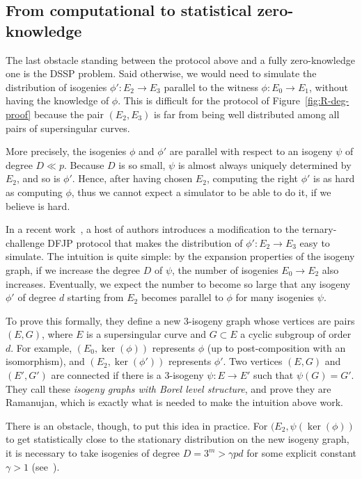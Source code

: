 \subsection{From computational to statistical zero-knowledge}

The last obstacle standing between the protocol above and a fully
zero-knowledge one is the DSSP problem. Said otherwise, we would need
to simulate the distribution of isogenies $\phi': E_2\to E_3$ parallel
to the witness $\phi: E_0\to E_1$, without having the knowledge of
$\phi$.  This is difficult for the protocol of
Figure~\ref{fig:R-deg-proof} because the pair $(E_2,E_3)$ is far from
being well distributed among all pairs of supersingular curves.

More precisely, the isogenies $\phi$ and $\phi'$ are parallel with
respect to an isogeny $\psi$ of degree $D \ll p$.  Because $D$ is so
small, $\psi$ is almost always uniquely determined by $E_2$, and so is
$\phi'$.  Hence, after having chosen $E_2$, computing the right
$\phi'$ is as hard as computing $\phi$, thus we cannot expect a
simulator to be able to do it, if we believe \R[deg] is hard.

In a recent work~\cite{cryptoeprint:2022/1469}, a host of
authors introduces a modification to the ternary-challenge DFJP
protocol that makes the distribution of $\phi':E_2\to E_3$ easy to
simulate. The intuition is quite simple: by the expansion properties
of the isogeny graph, if we increase the degree $D$ of $\psi$, the
number of isogenies $E_0\to E_2$ also increases.  Eventually, we
expect the number to become so large that any isogeny $\phi'$
of degree $d$ starting from $E_2$ becomes parallel to $\phi$ for many
isogenies $\psi$.

To prove this formally, they define a new $3$-isogeny graph whose
vertices are pairs $(E,G)$, where $E$ is a supersingular curve and
$G\subset E$ a cyclic subgroup of order $d$. For example,
$(E_0,\ker(\phi))$ represents $\phi$ (up to post-composition with an
isomorphism), and $(E_2,\ker(\phi'))$ represents $\phi'$. Two vertices
$(E,G)$ and $(E',G')$ are connected if there is a $3$-isogeny
$\psi:E\to E'$ such that $\psi(G) = G'$. They call these \emph{isogeny
  graphs with Borel level structure}, and prove they are Ramanujan,
which is exactly what is needed to make the intuition above work.

There is an obstacle, though, to put this idea in practice.  For
$(E_2,\psi(\ker(\phi))$ to get statistically close to the stationary
distribution on the new isogeny graph, it is necessary to take
isogenies of degree $D = 3^m > \gamma pd$ for some explicit constant
$\gamma > 1$ (see~\cite[Remark~12]{cryptoeprint:2022/1469}).

